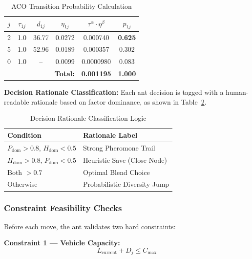 \documentclass[10pt,conference]{IEEEtran}
\begin{document}
\begin{table}[h]
\caption{ACO Transition Probability Calculation}
\label{tab:prob_calc}
\begin{center}
\begin{tabular}{|c|c|c|c|c|c|}
\hline
$j$ & $\tau_{1j}$ & $d_{1j}$ & $\eta_{1j}$ & $\tau^\alpha \cdot \eta^\beta$ & $p_{1j}$ \\
\hline
2 & 1.0 & 36.77 & 0.0272 & 0.000740 & \textbf{0.625} \\
5 & 1.0 & 52.96 & 0.0189 & 0.000357 & 0.302 \\
0 & 1.0 & -- & 0.0099 & 0.0000980 & 0.083 \\
\hline
\multicolumn{4}{|r|}{\textbf{Total:}} & \textbf{0.001195} & \textbf{1.000}\\
\hline
\end{tabular}
\end{center}
\end{table}

\textbf{Decision Rationale Classification:} Each ant decision is tagged with a human-readable rationale based on factor dominance, as shown in Table~\ref{tab:rationale}.

\begin{table}[h]
\caption{Decision Rationale Classification Logic}
\label{tab:rationale}
\begin{center}
\footnotesize
\begin{tabular}{|l|l|}
\hline
\textbf{Condition} & \textbf{Rationale Label} \\
\hline
$P_{\text{dom}} > 0.8$, $H_{\text{dom}} < 0.5$ & Strong Pheromone Trail \\
$H_{\text{dom}} > 0.8$, $P_{\text{dom}} < 0.5$ & Heuristic Save (Close Node) \\
Both $> 0.7$ & Optimal Blend Choice \\
Otherwise & Probabilistic Diversity Jump \\
\hline
\end{tabular}
\end{center}
\end{table}

\subsubsection{Constraint Feasibility Checks}
Before each move, the ant validates two hard constraints:

\textbf{Constraint 1 --- Vehicle Capacity:}
\begin{equation}
    L_{\text{current}} + D_j \leq C_{\max}
\end{equation}
\end{document}
